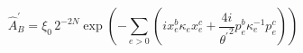 \begin{equation}
\hat{A}_{B}^{\prime }=\xi _{0}\,2^{-2N}\exp \left( -\sum_{e>0}\left(
ix_{e}^{b}\kappa _{e}x_{e}^{c}+{\frac{4i}{{\theta ^{\prime }}^{2}}}%
p_{e}^{b}\kappa _{e}^{-1}p_{e}^{c}\right) \right)  \label{eq:even_butterfly}
\end{equation}

